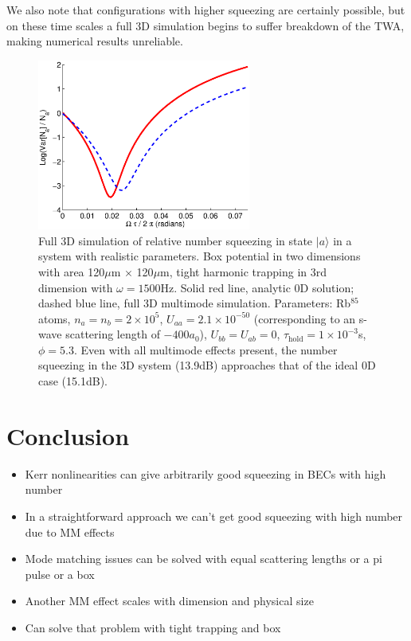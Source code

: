 \documentclass{iopart}
\begin{document}
We also note that configurations with higher squeezing are certainly possible, but on these time scales a full 3D simulation begins to suffer breakdown of the TWA, making numerical results unreliable.
\begin{figure}
  \centering
   \includegraphics[width=7cm]{figures/realistic_3d_squeezing_params.eps}
\caption{Full 3D simulation of relative number squeezing in state $|a\rangle$ in a system with realistic parameters. Box potential in two dimensions with area 120$\mu$m $\times$ 120$\mu$m, tight harmonic trapping in 3rd dimension with $\omega=1500$Hz. Solid red line, analytic 0D solution; dashed blue line, full 3D multimode simulation. Parameters: Rb$^{85}$ atoms, $n_a = n_b =2 \times 10^5$, $U_{aa}=2.1\times 10^{-50}$ (corresponding to an s-wave scattering length of $-400 a_0$), $U_{bb}=U_{ab}=0$, $\tau_{\mathrm{hold}}=1\times 10^{-3}$s, $\phi=5.3$. Even with all multimode effects present, the number squeezing in the 3D system (13.9dB) approaches that of the ideal 0D case (15.1dB).}
 \label{figRealistic3DParameters}
\end{figure}

\section{Conclusion}
\label{sectionConclusion}
\begin{itemize}
  \item Kerr nonlinearities can give arbitrarily good squeezing in BECs with high number
  \item In a straightforward approach we can't get good squeezing with high number due to MM effects
  \item Mode matching issues can be solved with equal scattering lengths or a pi pulse or a box
  \item Another MM effect scales with dimension and physical size
  \item Can solve that problem with tight trapping and box
\end{itemize}
\end{document}

